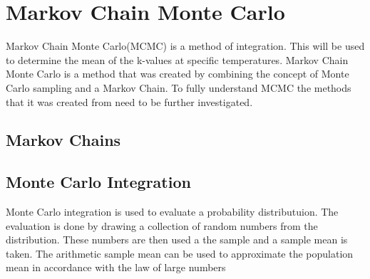 \section{Markov Chain Monte Carlo}
Markov Chain Monte Carlo(MCMC) is a method of integration. This will be used to determine the mean of the k-values at specific temperatures. 
	Markov Chain Monte Carlo is a method that was created by combining the concept of Monte Carlo sampling  and a Markov Chain. 
	To fully understand MCMC the methods that it was created from need to be further investigated.
	\subsection{Markov Chains}
		
		
		
	\subsection{Monte Carlo Integration}
	Monte Carlo integration is used to evaluate a probability distributuion. 
	The evaluation is done by drawing a collection of random numbers from the distribution.
	These numbers are then used a the sample and a sample mean is taken.
	The arithmetic sample mean can be used to approximate the population mean in accordance with the law of large numbers \citep{Gilks:1996} 
